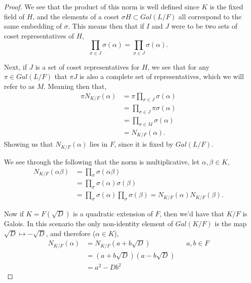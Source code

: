 \documentclass[11pt]{article}
\begin{document}
\begin{proof}
    We see that the product of this norm is well defined since $K$ is the fixed field of $H$, and the elements of a coset $\sigma H \subset Gal(L/F)$ all correspond to the same embedding of $\sigma$. This means then that if $I$ and $J$ were to be two sets of coset representatives of $H$,
    \[\prod_{\sigma \in J}\sigma(\alpha) = \prod_{\sigma\in J}\sigma(\alpha).\]

    Next, if $J$ is a set of coset representatives for $H$, we see that for any $\pi \in Gal(L/F)$ that $\pi J$ is also a complete set of representatives, which we will refer to as $M$. Meaning then that,
    \begin{align*}
        \pi N_{K/F}(\alpha) &= \pi \prod_{\sigma\in  J}\sigma(\alpha) \\
        &= \prod_{\sigma \in J}\pi \sigma(\alpha) \\
        &= \prod_{\sigma \in M}\sigma(\alpha) \\
        &= N_{K/F}(\alpha).
    \end{align*}
    Showing us that $N_{K/F}(\alpha)$ lies in $F$, since it is fixed by $Gal(L/F)$. 

    We see through the following that the norm is multiplicative, let $\alpha, \beta \in K$,
    \begin{align*}
        N_{K/F}(\alpha \beta) &= \prod_{\sigma}\sigma(\alpha\beta) \\
        &= \prod_\sigma \sigma(\alpha)\sigma(\beta) \\
        &= \prod_\sigma \sigma(\alpha)\prod_\sigma \sigma(\beta) = N_{K/F}(\alpha)N_{K/F}(\beta). 
    \end{align*}

    Now if $K = F(\sqrt{D})$ is a quadratic extension of $F$, then we'd have that $K/F$ is Galois. In this scenario the only non-identity element of $Gal(K/F)$ is the map $\sqrt{D} \mapsto -\sqrt{D}$, and therefore ($\alpha \in K$),
    \begin{align*}
        N_{K/F}(\alpha) &= N_{K/F}(a +b \sqrt{D}) && a,b \in F \\ 
        &= (a+b\sqrt{D})(a-b\sqrt{D}) \\
        &= a^{2} - Db^{2}
    \end{align*}


\end{proof}
\end{document}
